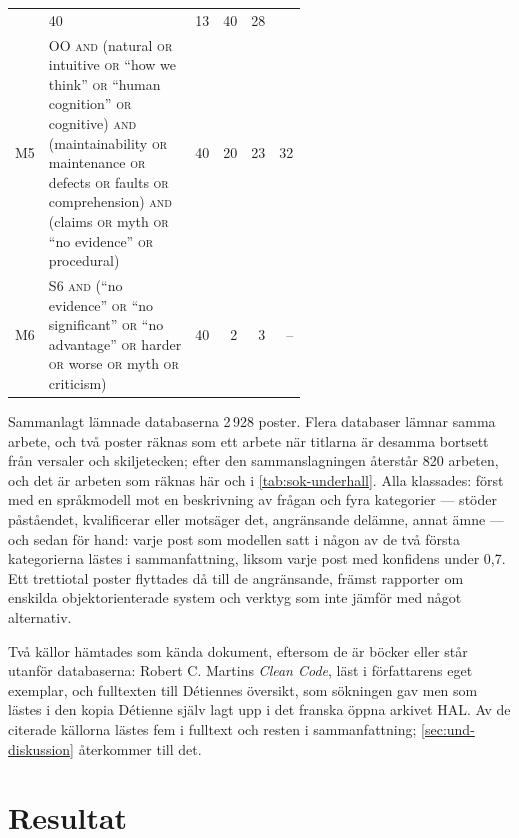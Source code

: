 \begin{table}[!b]
\begin{tabular}{@{}lp{0.58\linewidth}rrrr@{}}
       & 40 & 13 & 40 & 28 \\
    M5 & OO \textsc{and} (natural \textsc{or} intuitive \textsc{or} \enquote{how we think} \textsc{or} \enquote{human cognition} \textsc{or} cognitive) \textsc{and} (maintainability \textsc{or} maintenance \textsc{or} defects \textsc{or} faults \textsc{or} comprehension) \textsc{and} (claims \textsc{or} myth \textsc{or} \enquote{no evidence} \textsc{or} procedural)
       & 40 & 20 & 23 & 32 \\
    M6 & S6 \textsc{and} (\enquote{no evidence} \textsc{or} \enquote{no significant} \textsc{or} \enquote{no advantage} \textsc{or} harder \textsc{or} worse \textsc{or} myth \textsc{or} criticism)
       & 40 & 2 & 3 & -- \\
    \bottomrule
  \end{tabular}
\end{table}

Sammanlagt lämnade databaserna 2\,928 poster.  Flera databaser lämnar
samma arbete, och två poster räknas som ett arbete när titlarna är
desamma bortsett från versaler och skiljetecken; efter den
sammanslagningen återstår 820 arbeten, och det är arbeten som räknas här
och i \cref{tab:sok-underhall}.  Alla klassades: först med en
språkmodell mot en beskrivning av frågan och fyra kategorier --- stöder
påståendet, kvalificerar eller motsäger det, angränsande delämne, annat
ämne --- och sedan för hand: varje post som modellen satt i någon av de
två första kategorierna lästes i sammanfattning, liksom varje post med
konfidens under 0,7.  Ett trettiotal poster flyttades då till de
angränsande, främst rapporter om enskilda objektorienterade system och
verktyg som inte jämför med något alternativ.

Två källor hämtades som kända dokument, eftersom de är böcker eller
står utanför databaserna: Robert C. Martins \emph{Clean
Code}\autocite{Martin2008CleanCode}, läst i författarens eget exemplar,
och fulltexten till Détiennes översikt\autocite{Detienne1997}, som
sökningen gav men som lästes i den kopia Détienne själv lagt upp i det
franska öppna arkivet HAL.  Av de citerade källorna lästes fem i
fulltext\autocite{Detienne1997,CorritoreWiedenbeck2001,ArisholmSjoberg2004,Flint2026Python,Martin2008CleanCode}
och resten i sammanfattning; \cref{sec:und-diskussion} återkommer till
det.

\section{Resultat}
\label{sec:und-resultat}


